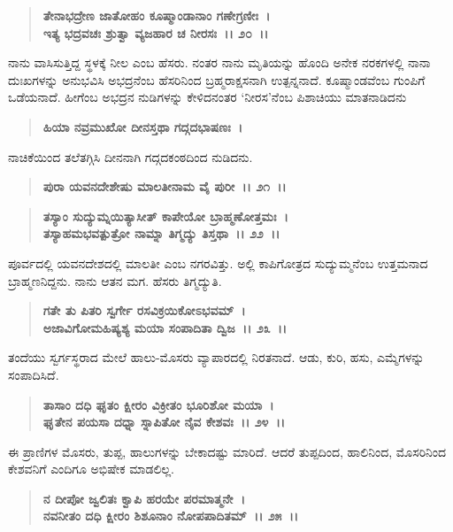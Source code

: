\begin{verse}
\textbf{ತೇನಾಭದ್ರೇಣ ಜಾತೋಹಂ ಕೂಷ್ಮಾಂಡಾನಾಂ ಗಣೇಗ್ರಣೀಃ~।}\\\textbf{ಇತ್ಯ ಭದ್ರವಚಃ ಶ್ರುತ್ವಾ ವ್ಯಜಹಾರ ಚ ನೀರಸಃ~।। ೨೦~।।}
\end{verse}

ನಾನು ವಾಸಿಸುತ್ತಿದ್ದ ಸ್ಥಳಕ್ಕೆ ನೀಲ ಎಂಬ ಹೆಸರು. ನಂತರ ನಾನು ಮೃತಿಯನ್ನು ಹೊಂದಿ ಅನೇಕ ನರಕಗಳಲ್ಲಿ ನಾನಾ ದುಃಖಗಳನ್ನು ಅನುಭವಿಸಿ ಅಭದ್ರನೆಂಬ ಹೆಸರಿನಿಂದ ಬ್ರಹ್ಮರಾಕ್ಷಸನಾಗಿ ಉತ್ಪನ್ನನಾದೆ. ಕೂಷ್ಮಾಂಡವೆಂಬ ಗುಂಪಿಗೆ ಒಡೆಯನಾದೆ. ಹೀಗೆಂಬ ಅಭದ್ರನ ನುಡಿಗಳನ್ನು ಕೇಳಿದನಂತರ `ನೀರಸ'ನೆಂಬ ಪಿಶಾಚಿಯು ಮಾತನಾಡಿದನು

\begin{verse}
\textbf{ಹಿಯಾ ನವ್ರಮುಖೋ ದೀನಸ್ತಥಾ ಗದ್ಗದಭಾಷಣಃ~।}
\end{verse}

ನಾಚಿಕೆಯಿಂದ ತಲೆತಗ್ಗಿಸಿ ದೀನನಾಗಿ ಗದ್ಗದಕಂಠದಿಂದ ನುಡಿದನು.

\begin{verse}
\textbf{ಪುರಾ ಯವನದೇಶೇಷು ಮಾಲತೀನಾಮ ವೈ ಪುರೀ~।। ೨೧~।। }
\end{verse}

\begin{verse}
\textbf{ತಸ್ಯಾಂ ಸುದ್ಯುಮ್ನಯಿತ್ಯಾಸೀತ್ ಕಾಪೇಯೋ ಬ್ರಾಹ್ಮಣೋತ್ತಮಃ~।}\\\textbf{ತಸ್ಯಾಹಮಭವತ್ಪುತ್ರೋ ನಾಮ್ನಾ ತಿಗ್ಮದ್ಯು ತಿಸ್ತಥಾ~।। ೨೨~।।}
\end{verse}

ಪೂರ್ವದಲ್ಲಿ ಯವನದೇಶದಲ್ಲಿ ಮಾಲತೀ ಎಂಬ ನಗರವಿತ್ತು. ಅಲ್ಲಿ ಕಾಪಿಗೋತ್ರದ ಸುದ್ಯುಮ್ಮನೆಂಬ ಉತ್ತಮನಾದ ಬ್ರಾಹ್ಮಣನಿದ್ದನು. ನಾನು ಆತನ ಮಗ. ಹೆಸರು ತಿಗ್ಮದ್ಯುತಿ.

\begin{verse}
\textbf{ಗತೇ ತು ಪಿತರಿ ಸ್ವರ್ಗೇ ರಸವಿಕ್ರಯಿಕೋಽಭವಮ್~।}\\\textbf{ಅಜಾವಿಗೋಮಹಿಷ್ಯಶ್ಯ ಮಯಾ ಸಂಪಾದಿತಾ ದ್ವಿಜ~।। ೨೩~।।}
\end{verse}

ತಂದೆಯು ಸ್ವರ್ಗಸ್ಥರಾದ ಮೇಲೆ ಹಾಲು-ಮೊಸರು ವ್ಯಾಪಾರದಲ್ಲಿ ನಿರತನಾದೆ. ಆಡು, ಕುರಿ, ಹಸು, ಎಮ್ಮೆಗಳನ್ನು ಸಂಪಾದಿಸಿದೆ.

\begin{verse}
\textbf{ತಾಸಾಂ ದಧಿ ಘೃತಂ ಕ್ಷೀರಂ ವಿಕ್ರೀತಂ ಭೂರಿಶೋ ಮಯಾ~।}\\\textbf{ಘೃತೇನ ಪಯಸಾ ದಧ್ನಾ ಸ್ನಾಪಿತೋ ನೈವ ಕೇಶವಃ~।। ೨೪~।।}
\end{verse}

ಈ ಪ್ರಾಣಿಗಳ ಮೊಸರು, ತುಪ್ಪ, ಹಾಲುಗಳನ್ನು ಬೇಕಾದಷ್ಟು ಮಾರಿದೆ. ಆದರೆ ತುಪ್ಪದಿಂದ, ಹಾಲಿನಿಂದ, ಮೊಸರಿನಿಂದ ಕೇಶವನಿಗೆ ಎಂದಿಗೂ ಅಭಿಷೇಕ ಮಾಡಲಿಲ್ಲ.

\begin{verse}
\textbf{ನ ದೀಪೋ ಜ್ವಲಿತಃ ಕ್ವಾಪಿ ಹರಯೇ ಪರಮಾತ್ಮನೇ~।}\\\textbf{ನವನೀತಂ ದಧಿ ಕ್ಷೀರಂ ಶಿಶೂನಾಂ ನೋಪಪಾದಿತಮ್~।। ೨೫~।।}
\end{verse}

